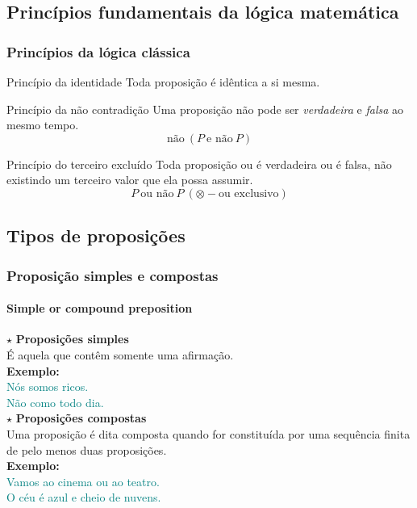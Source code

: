 \subsection{Princípios fundamentais da lógica matemática}
%
\begin{frame}
    \frametitle{Princípios da lógica clássica}
    \begin{block}{Princípio da identidade}
        Toda proposição é idêntica a si mesma. \\
    \end{block}
    \pause
    \begin{block}{Princípio da não contradição}
        Uma proposição não pode ser \textit{verdadeira} e \textit{falsa} ao mesmo tempo.
        $$ \text{não}~\left(P~\text{e não}~P\right) $$
    \end{block}
    \pause
    \begin{block}{Princípio do terceiro excluído}
        Toda proposição ou é verdadeira ou é falsa, não existindo um terceiro valor que ela possa assumir.
        $$ P~\text{ou não}~P~(\otimes - \text{ou exclusivo})$$
    \end{block}
\end{frame}
%
\subsection{Tipos de proposições}
%
\begin{frame}
    \frametitle{Proposição simples e compostas}
    \framesubtitle{Simple or compound preposition}
    $\star$ \textbf{Proposições simples}\\
    É aquela que contêm somente uma afirmação.\\
    \textbf{Exemplo:}\\
    \textcolor{teal}{Nós somos ricos.}\\
    \textcolor{teal}{Não como todo dia.}\\
    \hfill \break
    $\star$ \textbf{Proposições compostas}\\
    Uma proposição é dita composta quando for constituída por uma sequência finita de pelo menos duas proposições.\\
    \textbf{Exemplo:}\\
    \textcolor{teal}{Vamos ao cinema ou ao teatro.}\\
    \textcolor{teal}{O céu é azul e cheio de nuvens.}
\end{frame}
%

